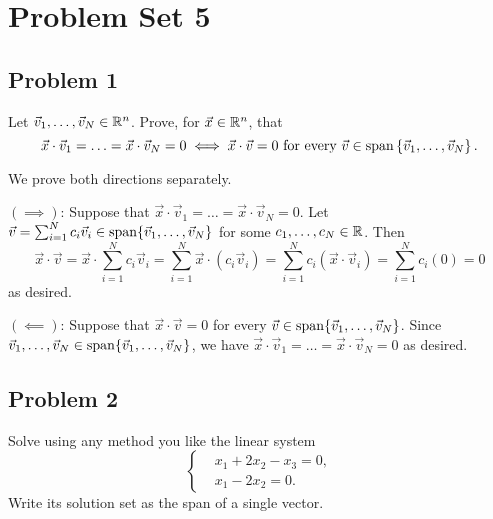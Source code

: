 \documentclass[main.tex]{subfiles}
\begin{document}
\section{Problem Set 5}

\subsection{Problem 1}
\begin{claim}
    Let $\vec{v}_1, \ldots , \vec{v}_N \in \mathbb R^n$. Prove, for $\vec{x} \in \mathbb R^n$, that
    \[\vec{x} \cdot \vec{v}_1 = \ldots = \vec{x} \cdot \vec{v}_N = 0 \iff \vec{x} \cdot \vec{v} = 0 \text{ for every } \vec{v} \in \operatorname{span}\left\{ \vec{v}_1, \ldots , \vec{v}_N \right\}.\]
\end{claim}

\begin{soln}
    We prove both directions separately.

    $(\implies)$: Suppose that $\vec{x}\cdot \vec{v}_1 = \ldots = \vec{x}\cdot \vec{v}_N = 0$. Let $\vec{v} = \sum_{i = 1}^N c_i\vec{v}_i\in \operatorname{span}\{\vec{v}_1, \ldots , \vec{v}_N\}$ for some $c_1, \ldots, c_N\in \mathbb R$. Then 
    \[\vec{x}\cdot \vec{v} = \vec{x}\cdot \sum_{i = 1}^N c_i\vec{v}_i = \sum_{i = 1}^N \vec{x}\cdot (c_i\vec{v}_i) = \sum_{i = 1}^N c_i(\vec{x}\cdot \vec{v}_i) = \sum_{i = 1}^N c_i(0) = 0\]
    as desired.

    $(\impliedby)$: Suppose that $\vec{x}\cdot \vec{v} = 0$ for every $\vec{v}\in \operatorname{span}\{\vec{v}_1, \ldots , \vec{v}_N\}$. Since $\vec{v}_1, \ldots , \vec{v}_N\in \operatorname{span}\{\vec{v}_1, \ldots , \vec{v}_N\}$, we have $\vec{x}\cdot \vec{v}_1 = \ldots = \vec{x}\cdot \vec{v}_N = 0$ as desired.
\end{soln}
\eject

\subsection{Problem 2}
\begin{claim}
    Solve using any method you like the linear system
    \[\left\{\begin{aligned}
        &x_1 + 2x_2 - x_3 = 0, \\
        &x_1 - 2x_2 = 0.
    \end{aligned}\right.\]
    Write its solution set as the span of a single vector.
\end{claim}
\end{document}
